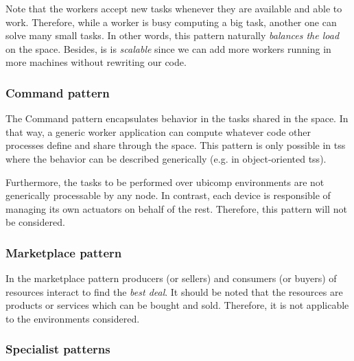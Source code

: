 Note that the workers accept new tasks whenever they are available and able to work.
Therefore, while a worker is busy computing a big task, another one can solve many small tasks.
In other words, this pattern naturally \emph{balances the load} on the space.
Besides, is is \emph{scalable} since we can add more workers running in more machines without rewriting our code.



\subsubsection{Command pattern}

The Command pattern encapsulates behavior in the tasks shared in the space.
In that way, a generic worker application can compute whatever code other processes define and share through the space.
This pattern is only possible in \aclp{ts} where the behavior can be described generically (e.g. in object-oriented \acp{ts}).

Furthermore, the tasks to be performed over \ac{ubicomp} environments are not generically processable by any node.
In contrast, each device is responsible of managing its own actuators on behalf of the rest.
Therefore, this pattern will not be considered.


\subsubsection{Marketplace pattern}

In the marketplace pattern producers (or sellers) and consumers (or buyers) of resources interact to find the \emph{best deal}.
It should be noted that the resources are products or services which can be bought and sold.
Therefore, it is not applicable to the environments considered. %


\subsubsection{Specialist patterns}

